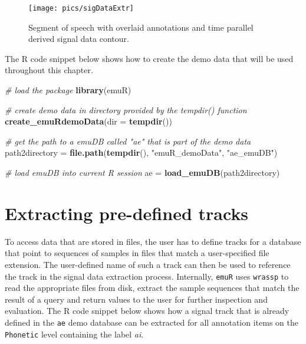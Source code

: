 \documentclass[]{book}
\newenvironment{Shaded}{\begin{snugshade}}{\end{snugshade}}
\newcommand{\CommentTok}[1]{\textcolor[rgb]{0.56,0.35,0.01}{\textit{#1}}}
\newcommand{\DataTypeTok}[1]{\textcolor[rgb]{0.13,0.29,0.53}{#1}}
\newcommand{\KeywordTok}[1]{\textcolor[rgb]{0.13,0.29,0.53}{\textbf{#1}}}
\newcommand{\NormalTok}[1]{#1}
\newcommand{\StringTok}[1]{\textcolor[rgb]{0.31,0.60,0.02}{#1}}
\begin{document}
\begin{figure}

{\centering \texttt{[image: pics/sigDataExtr]} 

}

\caption{Segment of speech with overlaid annotations and time parallel derived signal data contour.}\label{fig:sigDataExtr}
\end{figure}

The R code snippet below shows how to create the demo data that will be used throughout this chapter.

\begin{Shaded}
\begin{Highlighting}[]
\CommentTok{# load the package}
\KeywordTok{library}\NormalTok{(emuR)}

\CommentTok{# create demo data in directory provided by the tempdir() function}
\KeywordTok{create_emuRdemoData}\NormalTok{(}\DataTypeTok{dir =} \KeywordTok{tempdir}\NormalTok{())}

\CommentTok{# get the path to a emuDB called "ae" that is part of the demo data}
\NormalTok{path2directory =}\StringTok{ }\KeywordTok{file.path}\NormalTok{(}\KeywordTok{tempdir}\NormalTok{(), }
                           \StringTok{"emuR_demoData"}\NormalTok{, }
                           \StringTok{"ae_emuDB"}\NormalTok{)}

\CommentTok{# load emuDB into current R session}
\NormalTok{ae =}\StringTok{ }\KeywordTok{load_emuDB}\NormalTok{(path2directory)}
\end{Highlighting}
\end{Shaded}

\hypertarget{extracting-pre-defined-tracks}{%
\section{Extracting pre-defined tracks}\label{extracting-pre-defined-tracks}}

To access data that are stored in files, the user has to define tracks for a database that point to sequences of samples in files that match a user-specified file extension. The user-defined name of such a track can then be used to reference the track in the signal data extraction process. Internally, \texttt{emuR} uses \texttt{wrassp} to read the appropriate files from disk, extract the sample sequences that match the result of a query and return values to the user for further inspection and evaluation. The R code snippet below shows how a signal track that is already defined in the \texttt{ae} demo database can be extracted for all annotation items on the \texttt{Phonetic} level containing the label \emph{ai}.
\end{document}
